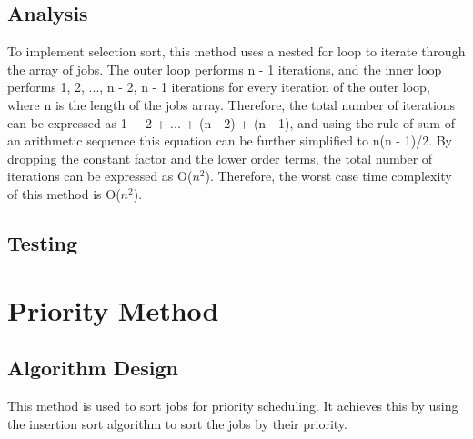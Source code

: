 \documentclass[12pt,a4paper]{article}
\begin{document}
		\subsection{Analysis}
			To implement selection sort, this method uses a nested for loop to iterate through the
			array of jobs. The outer loop performs n - 1 iterations, and the inner loop performs 
			1, 2, ..., n - 2, n - 1 iterations for every iteration of the outer loop, where n is 
			the length of the jobs array. Therefore, the total number of iterations can be expressed as 
			1 + 2 + ... + (n - 2) + (n - 1), and using the rule of sum of an arithmetic sequence 
			this equation can be further simplified to n(n - 1)/2. By dropping the constant factor and 
			the lower order terms, the total number of iterations can be expressed as O($n ^ 2$). Therefore, 
			the worst case time complexity of this method is O($n ^ 2$).\\
			
		\subsection{Testing}
	\newpage
	\section{Priority Method}
		\subsection{Algorithm Design}
			This method is used to sort jobs for priority scheduling. It achieves this by using the 
			insertion sort algorithm to sort the jobs by their priority.\\
			
\end{document}
